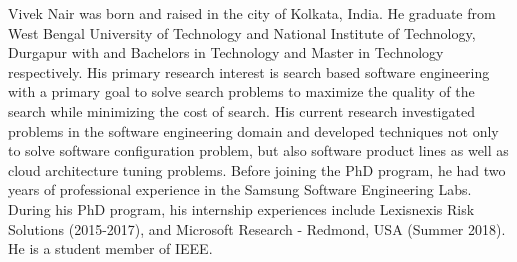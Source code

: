 Vivek Nair was born and raised in the city of Kolkata, India. He graduate from West Bengal University of Technology and National Institute of Technology, Durgapur with and Bachelors in Technology and Master in Technology respectively. 
 His primary research interest is search based software engineering with a primary goal to solve search problems to maximize the quality of the search while minimizing the cost of search.  His current research investigated problems in the software engineering domain and developed techniques not only to solve software configuration problem, but also software product lines as well as cloud architecture tuning problems.  Before joining the PhD program, he
had two years of professional experience in the Samsung Software Engineering Labs. 
During his PhD program, his internship experiences include Lexisnexis Risk Solutions (2015-2017), and
Microsoft Research - Redmond, USA (Summer 2018). He is a student member of IEEE.

